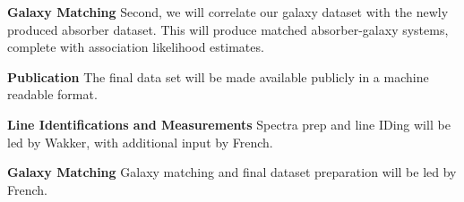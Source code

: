 \documentclass[12pt]{article}
\begin{document}
\textbf{Galaxy Matching}
\indent Second, we will correlate our galaxy dataset with the newly produced absorber dataset. This will produce matched absorber-galaxy systems, complete with association likelihood estimates.

\textbf{Publication}
\indent The final data set will be made available publicly in a machine readable format.



%
%
\budgetnarrative       %

\textbf{Line Identifications and Measurements}
\indent Spectra prep and line IDing will be led by Wakker, with additional input by French.

\textbf{Galaxy Matching}
\indent Galaxy matching and final dataset preparation will be led by French.
\end{document}
